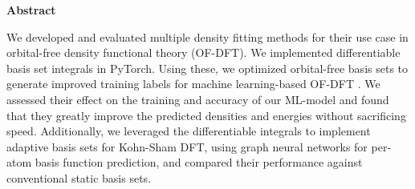 \newpage
\thispagestyle{plain}
	\large
	\begin{center}
    \textbf{Abstract}
\end{center}
\normalsize
We developed and evaluated multiple density fitting methods for their use case in orbital-free density functional theory (OF-DFT). We implemented differentiable basis set integrals in PyTorch. Using these, we optimized orbital-free basis sets to generate improved training labels for machine learning-based OF-DFT . We assessed their effect on the training and accuracy of our ML-model and found that they greatly improve the predicted densities and energies without sacrificing  speed. Additionally, we leveraged the differentiable integrals to implement adaptive basis sets for Kohn-Sham DFT, using graph neural networks for per-atom basis function prediction, and compared their performance against conventional static basis sets.
